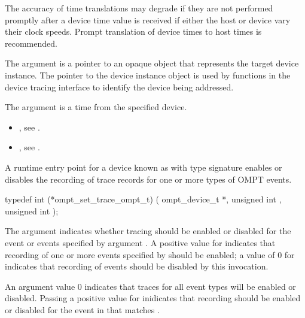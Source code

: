 \begin{note}
The accuracy of time translations may degrade if they are not
performed promptly after a device time value is received if either
the host or device vary their clock speeds. Prompt translation of
device times to host times is recommended.
\end{note}

\argdesc

The argument  is a pointer to an opaque object that
represents the target device instance. The pointer to the device
instance object is used by functions in the device tracing interface
to identify the device being addressed.

The argument  is a time from the specified device.

\crossreferences
\begin{itemize}
\item {},
see .
\item {},
see .
\end{itemize}

\label{sec:ompt_set_trace_ompt_t}

\summary
A runtime entry point for a device known as 
with type signature 
enables or disables the recording of trace records for one or more
types of OMPT events.

\format
\begin{ccppspecific}
\begin{omptInquiry}
typedef int (*ompt_set_trace_ompt_t) (
  ompt_device_t *,
  unsigned int ,
  unsigned int 
);
\end{omptInquiry}
\end{ccppspecific}

\argdesc

\devicedesc

The argument  indicates whether tracing should be
enabled or disabled for the event or events specified by
argument . A positive value for 
indicates that recording of one or more events specified by
 should be enabled; a value of 0 for  indicates
that recording of events should be disabled by this invocation.

An argument  value 0 indicates that traces for all
event types will be enabled or disabled.  Passing a positive value for
 inidicates that recording should be enabled or disabled
for the event in  that matches .


